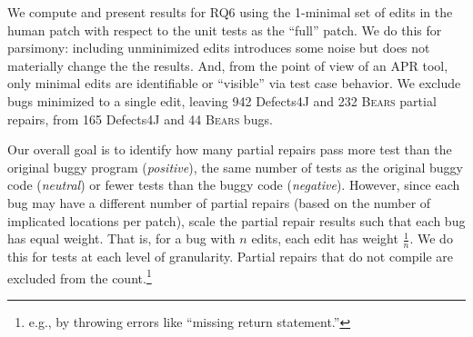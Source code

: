 \documentclass[10pt, conference]{IEEEtran}
\newcommand\bears{\textsc{Bears}\xspace}
\begin{document}
We compute and present results for RQ6 using the 1-minimal set of edits
in the human patch with respect to the unit tests as the ``full'' patch.  
We do this for parsimony: including
unminimized edits introduces some noise but does not materially change the
the results.  And, from the point of view of an APR tool, only
minimal edits are identifiable or ``visible'' via test case behavior. 
We exclude bugs
minimized to a single edit, leaving
942 Defects4J and 232 \bears partial repairs, from
165 Defects4J and 44 \bears bugs.  


Our overall goal is to identify how many partial repairs pass more test than the
original buggy program  (\emph{positive}), the  same number of tests as the
original buggy code (\emph{neutral}) or fewer tests than the buggy code
(\emph{negative}).  However, 
since each bug may have a different 
number of partial repairs (based on the number of implicated locations per
patch), scale the partial repair results such that each bug has equal weight.
That is, for a bug with $n$ edits, each edit has weight 
$\frac{1}{n}$. We do this for tests at each level of granularity.  Partial
repairs that do not compile are
excluded from the count.\footnote{e.g., by throwing errors like ``missing return statement.''}
\end{document}
